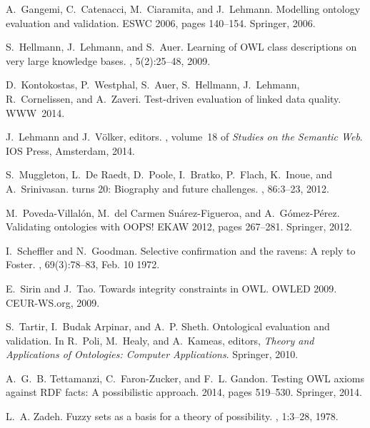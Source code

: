 \documentclass{sig-alternate}
\begin{document}
\begin{thebibliography}{10}
A.~Gangemi, C.~Catenacci, M.~Ciaramita, and J.~Lehmann.
\newblock Modelling ontology evaluation and validation.
\newblock ESWC 2006, pages 140--154. Springer, 2006.

S.~Hellmann, J.~Lehmann, and S.~Auer.
\newblock Learning of {OWL} class descriptions on very large knowledge bases.
, 5(2):25--48, 2009.

D.~Kontokostas, P.~Westphal, S.~Auer, S.~Hellmann, J.~Lehmann, R.~Cornelissen,
  and A.~Zaveri.
\newblock Test-driven evaluation of linked data quality.
\newblock WWW~2014.

J.~Lehmann and J.~V\"olker, editors.
, volume~18 of {\em Studies on
  the Semantic Web}.
\newblock IOS Press, Amsterdam, 2014.

S.~Muggleton, L.~{De Raedt}, D.~Poole, I.~Bratko, P.~Flach, K.~Inoue, and
  A.~Srinivasan.
 turns 20: Biography and future challenges.
, 86:3--23, 2012.

M.~Poveda-Villal{\'o}n, M.~del Carmen Su{\'a}rez-Figueroa, and
  A.~G{\'o}mez-P{\'e}rez.
\newblock Validating ontologies with {OOPS}!
\newblock EKAW 2012, pages
  267--281. Springer, 2012.

I.~Scheffler and N.~Goodman.
\newblock Selective confirmation and the ravens: A reply to {Foster}.
, 69(3):78--83, Feb. 10 1972.

E.~Sirin and J.~Tao.
\newblock Towards integrity constraints in {OWL}.
\newblock OWLED 2009. CEUR-WS.org, 2009.

S.~Tartir, I.~{Budak Arpinar}, and A.~P. Sheth.
\newblock Ontological evaluation and validation.
\newblock In R.~Poli, M.~Healy, and A.~Kameas, editors, {\em Theory and
  Applications of Ontologies: Computer Applications}. Springer, 2010.

A.~G.~B. Tettamanzi, C.~Faron-Zucker, and F.~L. Gandon.
\newblock Testing {OWL} axioms against {RDF} facts: A possibilistic approach.
 2014, pages 519--530. Springer, 2014.

L.~A. Zadeh.
\newblock Fuzzy sets as a basis for a theory of possibility.
, 1:3--28, 1978.

\end{thebibliography}
\end{document}
